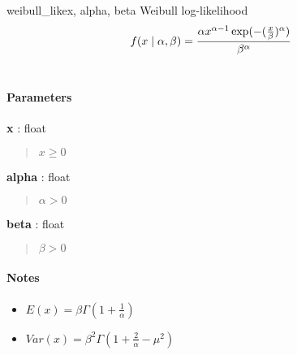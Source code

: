 \hypertarget{pymc.distributions.weibull_like}{}
\begin{funcdesc}{weibull\_like}{x, alpha, beta}
Weibull log-likelihood
\begin{gather}
\begin{split}f(x \mid \alpha, \beta) = \frac{\alpha x^{\alpha - 1}
\exp(-(\frac{x}{\beta})^{\alpha})}{\beta^\alpha}\end{split}\notag\\\begin{split}\end{split}\notag
\end{gather}\paragraph{Parameters}\begin{paramlist}

\item[] \textbf{x} : float
\begin{quote}

$x \ge 0$
\end{quote}

\item[] \textbf{alpha} : float
\begin{quote}

$\alpha>0$
\end{quote}

\item[] \textbf{beta} : float
\begin{quote}

$\beta>0$
\end{quote}
\end{paramlist}
\paragraph{Notes}
\begin{itemize}
\item {} 
$E(x)=\beta \Gamma(1+\frac{1}{\alpha})$

\item {} 
$Var(x)=\beta^2 \Gamma(1+\frac{2}{\alpha} - \mu^2)$

\end{itemize}
\end{funcdesc}

